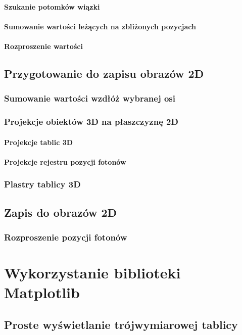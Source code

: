 \paragraph{Szukanie potomków wiązki}
\paragraph{Sumowanie wartości leżących na zbliżonych pozycjach}
\paragraph{Rozproszenie wartości}

\subsection{Przygotowanie do zapisu obrazów 2D}
\subsubsection{Sumowanie wartości wzdłóż wybranej osi}
\subsubsection{Projekcje obiektów 3D na płaszczyznę 2D}
\paragraph{Projekcje tablic 3D}
\paragraph{Projekcje rejestru pozycji fotonów}
\subsubsection{Plastry tablicy 3D}
\subsection{Zapis do obrazów 2D}
\subsubsection{Rozproszenie pozycji fotonów}

\section{Wykorzystanie biblioteki Matplotlib}
\subsection{Proste wyświetlanie trójwymiarowej tablicy}

